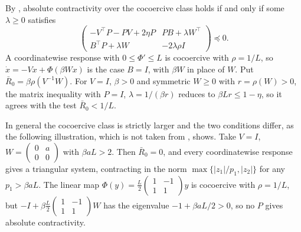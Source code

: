 By \cite[Theorem~1]{davydov2024exponential}, absolute contractivity over the cocoercive class
holds if and only if some $\lambda\ge0$ satisfies
\[
 \begin{pmatrix}
 -V^\top P-PV+2\eta P & PB+\lambda W^\top\\
 B^\top P+\lambda W & -2\lambda\rho I
 \end{pmatrix}\preceq0.
\]
A coordinatewise response with $0\le \Phi'\le L$ is cocoercive with $\rho=1/L$, so
$\dot x=-Vx+\Phi(\beta Wx)$ is the case $B=I$, with $\beta W$ in place of $W$. Put
$\bar R_0=\beta\rho(V^{-1}W)$. For $V=I$, $\beta>0$ and symmetric $W\ge0$ with $r=\rho(W)>0$, the
matrix inequality with $P=I$, $\lambda=1/(\beta r)$ reduces to $\beta Lr\le1-\eta$, so it agrees
with the test $\bar R_0<1/L$.

In general the cocoercive class is strictly larger and the two conditions differ, as the
following illustration, which is not taken from \cite{davydov2024exponential}, shows. Take $V=I$,
$W=\begin{pmatrix}0&a\\0&0\end{pmatrix}$ with $\beta aL>2$. Then $\bar R_0=0$, and every coordinatewise
response gives a triangular system, contracting in the norm $\max\{|z_1|/p_1,|z_2|\}$ for any
$p_1>\beta aL$. The linear map
$\Phi(y)=\frac L2\begin{pmatrix}1&-1\\1&1\end{pmatrix}y$ is cocoercive with $\rho=1/L$, but
$-I+\beta\frac L2\begin{pmatrix}1&-1\\1&1\end{pmatrix}W$ has the eigenvalue $-1+\beta aL/2>0$, so no
$P$ gives absolute contractivity.

